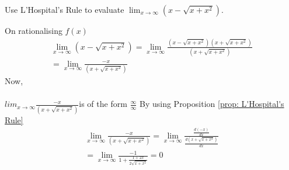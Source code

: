 \documentclass[journal,12pt,twocolumn]{IEEEtran}
\begin{document}
%
%
\begin{problem}
Use L'Hospital's Rule to evaluate $\lim_{x \to \infty}{(x-\sqrt{x+x^2})}$.
\end{problem}
\solution On rationalising $f(x)$ 
\begin{align}
\lim_{x \to \infty}{(x-\sqrt{x+x^2})}=\lim_{x \to \infty}{\frac{(x-\sqrt{x+x^2})(x+\sqrt{x+x^2})}{(x+\sqrt{x+x^2})}}\\
=\lim_{x \to \infty}{\frac{-x}{(x+\sqrt{x+x^2})}}
\end{align}
Now,\\\\
$lim_{x \to \infty}{\frac{-x}{(x+\sqrt{x+x^2})}}$is of the form $\frac{\infty}{\infty}$
By using Proposition \ref{prop: L'Hospital's Rule}
\begin{align}
\lim_{x \to \infty}{\frac{-x}{(x+\sqrt{x+x^2})}}=\lim_{x \to \infty}{\frac{\frac{d(-x)}{dx}}{\frac{d(x+\sqrt{x+x^2})}{dx}}}\\
=\lim_{x \to \infty}{\frac{-1}{1+\frac{1+2x}{2\sqrt{x+x^2}}}}=0
\end{align}
\end{document}
